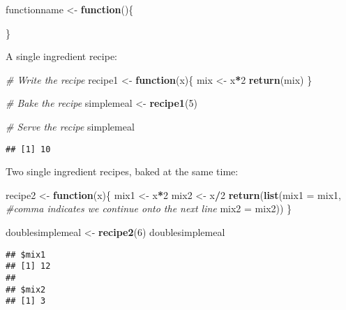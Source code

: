 \documentclass[
]{article}
\newenvironment{Shaded}{\begin{snugshade}}{\end{snugshade}}
\newcommand{\CommentTok}[1]{\textcolor[rgb]{0.56,0.35,0.01}{\textit{#1}}}
\newcommand{\ControlFlowTok}[1]{\textcolor[rgb]{0.13,0.29,0.53}{\textbf{#1}}}
\newcommand{\DataTypeTok}[1]{\textcolor[rgb]{0.13,0.29,0.53}{#1}}
\newcommand{\DecValTok}[1]{\textcolor[rgb]{0.00,0.00,0.81}{#1}}
\newcommand{\KeywordTok}[1]{\textcolor[rgb]{0.13,0.29,0.53}{\textbf{#1}}}
\newcommand{\NormalTok}[1]{#1}
\newcommand{\OperatorTok}[1]{\textcolor[rgb]{0.81,0.36,0.00}{\textbf{#1}}}
\newcommand{\StringTok}[1]{\textcolor[rgb]{0.31,0.60,0.02}{#1}}
\begin{document}
\begin{Shaded}
\begin{Highlighting}[]
\NormalTok{functionname <-}\StringTok{ }\ControlFlowTok{function}\NormalTok{()\{}
  
\NormalTok{\}}
\end{Highlighting}
\end{Shaded}

A single ingredient recipe:

\begin{Shaded}
\begin{Highlighting}[]
\CommentTok{# Write the recipe}
\NormalTok{recipe1 <-}\StringTok{ }\ControlFlowTok{function}\NormalTok{(x)\{}
\NormalTok{  mix <-}\StringTok{ }\NormalTok{x}\OperatorTok{*}\DecValTok{2}
  \KeywordTok{return}\NormalTok{(mix)}
\NormalTok{\}}

\CommentTok{# Bake the recipe}
\NormalTok{simplemeal <-}\StringTok{ }\KeywordTok{recipe1}\NormalTok{(}\DecValTok{5}\NormalTok{)}

\CommentTok{# Serve the recipe}
\NormalTok{simplemeal}
\end{Highlighting}
\end{Shaded}

\begin{verbatim}
## [1] 10
\end{verbatim}

Two single ingredient recipes, baked at the same time:

\begin{Shaded}
\begin{Highlighting}[]
\NormalTok{recipe2 <-}\StringTok{ }\ControlFlowTok{function}\NormalTok{(x)\{}
\NormalTok{  mix1 <-}\StringTok{ }\NormalTok{x}\OperatorTok{*}\DecValTok{2}
\NormalTok{  mix2 <-}\StringTok{ }\NormalTok{x}\OperatorTok{/}\DecValTok{2}
  \KeywordTok{return}\NormalTok{(}\KeywordTok{list}\NormalTok{(}\DataTypeTok{mix1 =}\NormalTok{ mix1, }\CommentTok{#comma indicates we continue onto the next line}
              \DataTypeTok{mix2 =}\NormalTok{ mix2))}
\NormalTok{\}}

\NormalTok{doublesimplemeal <-}\StringTok{ }\KeywordTok{recipe2}\NormalTok{(}\DecValTok{6}\NormalTok{)}
\NormalTok{doublesimplemeal}
\end{Highlighting}
\end{Shaded}

\begin{verbatim}
## $mix1
## [1] 12
## 
## $mix2
## [1] 3
\end{verbatim}
\end{document}

